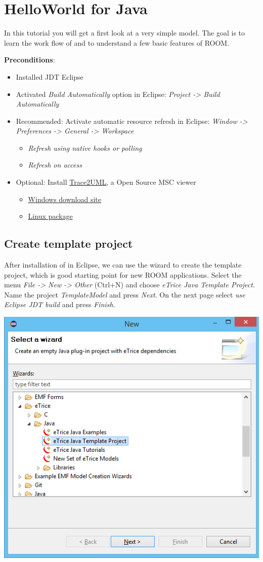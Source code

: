 \section{HelloWorld for Java}

In this tutorial you will get a first look at a very simple \eTrice{} model. The goal is to learn the work flow of \eTrice{} and to understand a few basic features of ROOM.

\textbf{Preconditions}:
\begin{itemize}
	\item Installed JDT Eclipse
	\item Activated \emph{Build Automatically} option in Eclipse: \emph{Project -> Build Automatically}
	\item Recommended: Activate automatic resource refresh in Eclipse: \emph{Window -> Preferences -> General -> Workspace}
	\begin{itemize}
		\item \emph{Refresh using native hooks or polling}
		\item \emph{Refresh on access}
	\end{itemize}
	\item Optional: Install \href{http://trace2uml.stage.tigris.org/}{Trace2UML}, a Open Source MSC viewer
	\begin{itemize}
		\item \href{http://trace2uml.tigris.org/servlets/ProjectDocumentList?folderID=6208}{Windows download site}
		\item \href{http://apt.astade.de/}{Linux package}
	\end{itemize}
	
\end{itemize}

\subsection{Create template project}
After installation of \eTrice in Eclipse, we can use the wizard to create the template project, which is good starting point for new ROOM applications. Select the menu \emph{File -> New -> Other} (Ctrl+N) and choose \emph{eTrice Java Template Project}. Name the project \emph{TemplateModel} and press \emph{Next}. On the next page select \emph{use Eclipse JDT build} and press \emph{Finish}.

\includegraphics[width=.5\textwidth]{images/014-wizard.png}

